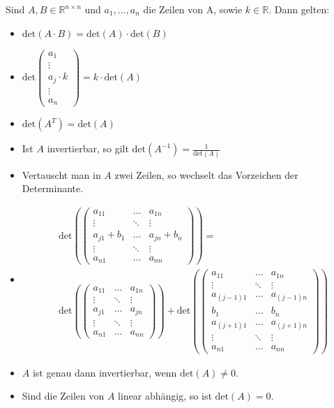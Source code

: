 Sind $A, B \in \mathbb{R}^{n \times n}$ und $a_1,\dots,a_n$ die Zeilen von A, sowie $k \in \mathbb{R}$. Dann gelten:
\begin{itemize}
	\item{$\text{det}(A\cdot B) = \text{det}(A) \cdot \text{det}(B)$}
	\item{$\text{det}\begin{pmatrix}a_1\\\vdots\\a_j\cdot k\\\vdots\\a_n\end{pmatrix} = k \cdot \text{det}(A)$}
	\item{$\text{det}(A^T) = \text{det}(A)$}
	\item{Ist $A$ invertierbar, so gilt $\text{det}(A^{-1}) = \frac{1}{\text{det}(A)}$}
	\item{Vertauscht man in $A$ zwei Zeilen, so wechselt das Vorzeichen der Determinante.}
	\item{\begin{align*}
		&\text{det}\left(\begin{pmatrix}
			a_{11} & \dots & a_{1n} \\
			\vdots & \ddots & \vdots \\
			a_{j1}+b_1 & \dots & a_{jn} + b_n \\
			\vdots & \ddots & \vdots \\
			a_{n1} & \dots & a_{nn}
		\end{pmatrix}\right) =\\
		&\text{det}\left(\begin{pmatrix}
			a_{11} & \dots & a_{1n} \\
			\vdots & \ddots & \vdots \\
			a_{j1} & \dots & a_{jn} \\
			\vdots & \ddots & \vdots \\
			a_{n1} & \dots & a_{nn}
		\end{pmatrix}\right) + \text{det}\left(\begin{pmatrix}
			a_{11} & \dots & a_{1n} \\
			\vdots & \ddots & \vdots \\
			a_{(j-1)1} & \dots & a_{(j-1)n} \\
			b_1 & \dots & b_n \\
			a_{(j+1)1} & \dots & a_{(j+1)n} \\
			\vdots & \ddots & \vdots \\
			a_{n1} & \dots & a_{nn}
		\end{pmatrix}\right)
	\end{align*}}
	\item{$A$ ist genau dann invertierbar, wenn $\text{det}(A) \neq 0$.}
	\item{Sind die Zeilen von $A$ linear abhängig, so ist $\text{det}(A) = 0$.}
\end{itemize}

